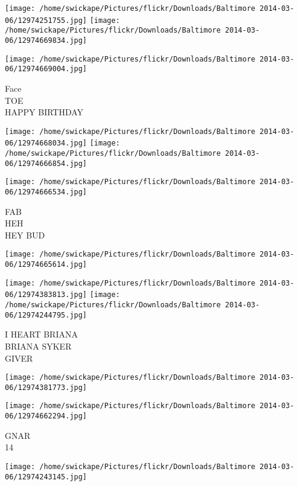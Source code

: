 \documentclass[10pt,letterpaper]{article}
\begin{document}
\texttt{[image: /home/swickape/Pictures/flickr/Downloads/Baltimore 2014-03-06/12974251755.jpg]}
\texttt{[image: /home/swickape/Pictures/flickr/Downloads/Baltimore 2014-03-06/12974669834.jpg]}

\vspace{0.25in}
\texttt{[image: /home/swickape/Pictures/flickr/Downloads/Baltimore 2014-03-06/12974669004.jpg]}

Face\\
TOE\\
HAPPY BIRTHDAY\\
\pagebreak

\texttt{[image: /home/swickape/Pictures/flickr/Downloads/Baltimore 2014-03-06/12974668034.jpg]}
\texttt{[image: /home/swickape/Pictures/flickr/Downloads/Baltimore 2014-03-06/12974666854.jpg]}

\texttt{[image: /home/swickape/Pictures/flickr/Downloads/Baltimore 2014-03-06/12974666534.jpg]}

FAB\\
HEH\\
HEY BUD\\
\pagebreak

\texttt{[image: /home/swickape/Pictures/flickr/Downloads/Baltimore 2014-03-06/12974665614.jpg]}

\vspace{0.25in}
\texttt{[image: /home/swickape/Pictures/flickr/Downloads/Baltimore 2014-03-06/12974383813.jpg]}
\texttt{[image: /home/swickape/Pictures/flickr/Downloads/Baltimore 2014-03-06/12974244795.jpg]}

I HEART BRIANA\\
BRIANA SYKER\\
GIVER\\
\pagebreak

\texttt{[image: /home/swickape/Pictures/flickr/Downloads/Baltimore 2014-03-06/12974381773.jpg]}

\vspace{0.25in}
\texttt{[image: /home/swickape/Pictures/flickr/Downloads/Baltimore 2014-03-06/12974662294.jpg]}

GNAR\\
14\\
\pagebreak

\texttt{[image: /home/swickape/Pictures/flickr/Downloads/Baltimore 2014-03-06/12974243145.jpg]}
\end{document}
